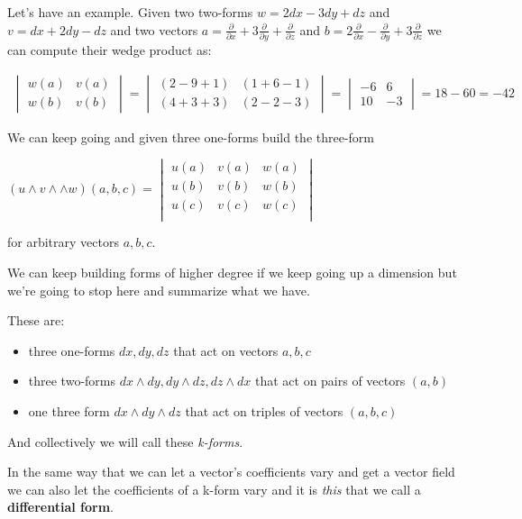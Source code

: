 \documentclass{article}
\begin{document}
Let's have an example. Given two two-forms $w = 2dx - 3dy + dz$ and $v = dx +
2dy - dz$ and two vectors $a = \frac{\partial}{\partial x} +
3\frac{\partial}{\partial y} + \frac{\partial}{\partial z}$ and $b =
2\frac{\partial}{\partial x} - \frac{\partial}{\partial y} +
3\frac{\partial}{\partial z}$ we can compute their wedge product as:

\begin{align*}
  \begin{vmatrix}
    w (a) & v(a) \\
    w (b) & v(b)
  \end{vmatrix} =
  \begin{vmatrix}
    (2 - 9 + 1) & (1 + 6 - 1) \\
    (4 + 3 + 3) & (2 - 2 -3)
  \end{vmatrix} =
  \begin{vmatrix}
    -6 & 6 \\
    10 & -3 
  \end{vmatrix} = 18 - 60 = -42
\end{align*}

We can keep going and given three one-forms build the three-form

$
(u \wedge v \wedge \wedge w) (a, b, c) =
\begin{vmatrix}
  u (a) & v (a) & w (a) \\
  u (b) & v (b) & w (b) \\
  u (c) & v (c) & w (c) \\
\end{vmatrix}
$

for arbitrary vectors $a, b, c$.

We can keep building forms of higher degree if we keep going up a dimension but
we're going to stop here and summarize what we have.

These are:

\begin{itemize}
  \item three one-forms $dx, dy, dz$ that act on vectors $a, b, c$
  \item three two-forms $dx \wedge dy, dy \wedge dz, dz \wedge dx$ that act on
    pairs of vectors $(a, b)$
  \item one three form $dx \wedge dy \wedge dz$ that act on triples of vectors
    $(a, b, c)$
\end{itemize}

And collectively we will call these \textit{k-forms}.

In the same way that we can let a vector's coefficients vary and get a vector
field we can also let the coefficients of a k-form vary and
it is \textit{this} that we call a \textbf{differential form}.
\end{document}
